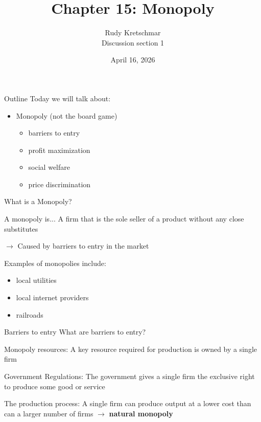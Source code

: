 \documentclass[compress]{beamer}
\title{Chapter 15: Monopoly}
\author{Rudy Kretschmar \\
    Discussion section 1}
\date{April 16, 2026}
\begin{document}
\begin{frame}
    \titlepage 
\end{frame}

\begin{frame}{Outline}
    Today we will talk about:
    \vspace{3mm}
    \begin{itemize}
        \item Monopoly (not the board game)
        \begin{itemize}
            \item barriers to entry
            \item profit maximization
            \item social welfare
            \item price discrimination
        \end{itemize}
    \end{itemize}
\end{frame}

\begin{frame}{What is a Monopoly?}
    \begin{block}{A monopoly is...}
        A firm that is the sole seller of a product without any close substitutes

        \vspace{2mm}

        $\to$ Caused by barriers to entry in the market
    \end{block}
    Examples of monopolies include:
    \begin{itemize}
        \item local utilities
        \item local internet providers
        \item railroads
    \end{itemize}
\end{frame}


\begin{frame}{Barriers to entry}
What are barriers to entry?

\vspace{2mm}

\begin{block}{Monopoly resources:}
    A key resource required for production is owned by a single firm
\end{block}

\begin{block}{Government Regulations:}
    The government gives a single firm the exclusive right to produce some good or service
\end{block}

\begin{block}{The production process:}
    A single firm can produce output at a lower cost than can a larger number of firms $\to$ \textbf{natural monopoly}
\end{block}
\end{frame}
\end{document}
